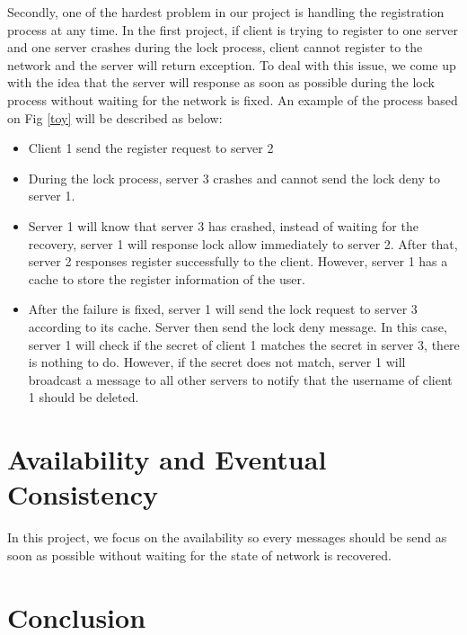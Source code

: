 \documentclass[10pt,twocolumn]{article}
\begin{document}
Secondly, one of the hardest problem in our project is handling the registration process at any time. In the first project, if client is trying to register to one server and one server crashes during the lock process, client cannot register to the network and the server will return exception. To deal with this issue, we come up with the idea that the server will response as soon as possible during the lock process without waiting for the network is fixed. An example of the process based on Fig \ref{toy} will be described as below:

\begin{itemize}
\item Client 1 send the register request to server 2
\item During the lock process, server 3 crashes and cannot send the lock deny to server 1.
\item Server 1 will know that server 3 has crashed, instead of waiting for the recovery, server 1 will response lock allow immediately to server 2. After that, server 2 responses register successfully to the client. However, server 1 has a cache to store the register information of the user.
\item After the failure is fixed, server 1 will send the lock request to server 3 according to its cache. Server then send the lock deny message. In this case, server 1 will check if the secret of client 1 matches the secret in server 3, there is nothing to do. However, if the secret does not match, server 1 will broadcast a message to all other servers to notify that the username of client 1 should be deleted. 
\end{itemize}



	
\section{Availability and Eventual Consistency}
In this project, we focus on the availability so every messages should be send as soon as possible without waiting for the state of network is recovered.

\section{Conclusion}
\end{document}
